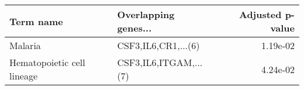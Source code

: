 \begin{tabular}{llr}
\toprule
                 Term name &  Overlapping genes... &  Adjusted p-value \\
\midrule
                   Malaria &   CSF3,IL6,CR1,...(6) &          1.19e-02 \\
Hematopoietic cell lineage & CSF3,IL6,ITGAM,...(7) &          4.24e-02 \\
\bottomrule
\end{tabular}
